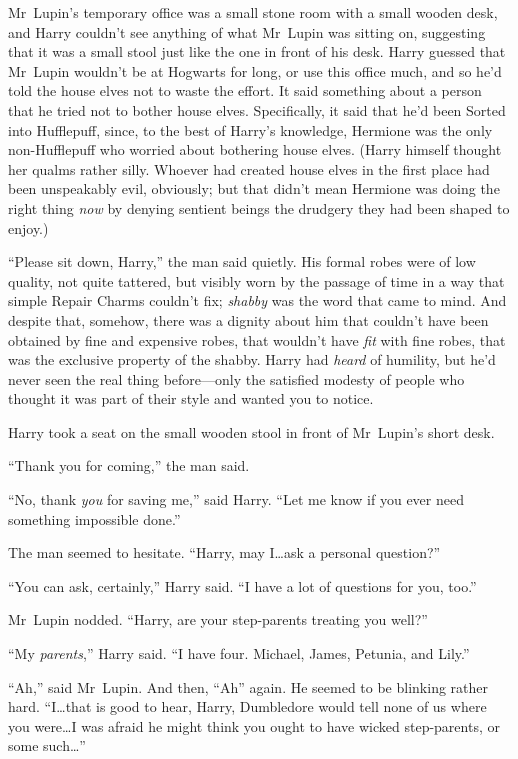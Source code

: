 \later

Mr~Lupin’s temporary office was a small stone room with a small wooden desk, and Harry couldn’t see anything of what Mr~Lupin was sitting on, suggesting that it was a small stool just like the one in front of his desk. Harry guessed that Mr~Lupin wouldn’t be at Hogwarts for long, or use this office much, and so he’d told the house elves not to waste the effort. It said something about a person that he tried not to bother house elves. Specifically, it said that he’d been Sorted into Hufflepuff, since, to the best of Harry’s knowledge, Hermione was the only non-Hufflepuff who worried about bothering house elves. (Harry himself thought her qualms rather silly. Whoever had created house elves in the first place had been unspeakably evil, obviously; but that didn’t mean Hermione was doing the right thing \emph{now} by denying sentient beings the drudgery they had been shaped to enjoy.)

“Please sit down, Harry,” the man said quietly. His formal robes were of low quality, not quite tattered, but visibly worn by the passage of time in a way that simple Repair Charms couldn’t fix; \emph{shabby} was the word that came to mind. And despite that, somehow, there was a dignity about him that couldn’t have been obtained by fine and expensive robes, that wouldn’t have \emph{fit} with fine robes, that was the exclusive property of the shabby. Harry had \emph{heard} of humility, but he’d never seen the real thing before—only the satisfied modesty of people who thought it was part of their style and wanted you to notice.

Harry took a seat on the small wooden stool in front of Mr~Lupin’s short desk.

“Thank you for coming,” the man said.

“No, thank \emph{you} for saving me,” said Harry. “Let me know if you ever need something impossible done.”

The man seemed to hesitate. “Harry, may I…ask a personal question?”

“You can ask, certainly,” Harry said. “I have a lot of questions for you, too.”

Mr~Lupin nodded. “Harry, are your step-parents treating you well?”

“My \emph{parents},” Harry said. “I have four. Michael, James, Petunia, and Lily.”

“Ah,” said Mr~Lupin. And then, “Ah” again. He seemed to be blinking rather hard. “I…that is good to hear, Harry, Dumbledore would tell none of us where you were…I was afraid he might think you ought to have wicked step-parents, or some such…”

